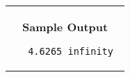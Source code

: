 \documentclass[11pt]{article}
\begin{document}
\begin{tabular}{ll}
&

\parbox{3in}{{\large\bf Sample Output}

\vspace{0.15in}

{\tt
4.6265\linebreak
infinity
}
}

\vspace{0.2in}


\\
\end{tabular}
\end{document}
